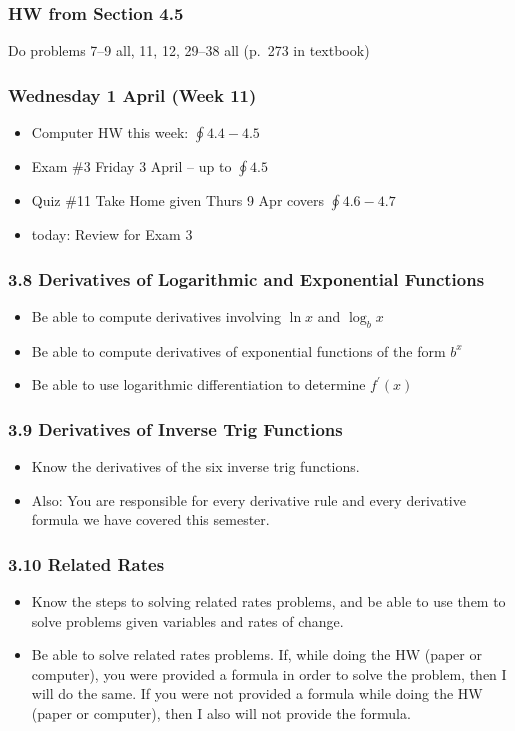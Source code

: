 \documentclass[14pt]{beamer}
\begin{document}
\begin{frame}
\frametitle{HW from Section 4.5}
Do problems 7--9 all, 11, 12, 29--38 all (p.\ 273 in textbook)
\end{frame}



\begin{frame}
\frametitle{Wednesday 1 April (Week 11)}
\small
\begin{itemize}
\item Computer HW this week: $\oint 4.4-4.5$
\item Exam \#3 Friday 3 April -- up to $\oint 4.5$
\item Quiz \#11 Take Home given Thurs 9 Apr covers $\oint 4.6-4.7$
\item today: Review for Exam 3
\end{itemize}
\end{frame}

\begin{frame}
\frametitle{\small 3.8 Derivatives of Logarithmic and Exponential Functions}
\small
\begin{itemize}
\item Be able to compute derivatives involving $\ln x$ and $\log_b x$
\item Be able to compute derivatives of exponential functions of the form $b^x$
\item Be able to use logarithmic differentiation to determine $f^{\prime}(x)$
\end{itemize}
\end{frame}

\begin{frame}
\frametitle{\small 3.9 Derivatives of Inverse Trig Functions}
\small
\begin{itemize}
\item Know the derivatives of the six inverse trig functions.
\item Also: You are responsible for every derivative rule and every derivative formula we have covered this semester.
\end{itemize} 
\end{frame}

\begin{frame}
\frametitle{\small 3.10 Related Rates}
\small
\begin{itemize}
\item Know the steps to solving related rates problems, and be able to use them to solve problems given variables and rates of change.
\item Be able to solve related rates problems.  If, while doing the HW (paper or computer), you were provided a formula in order to solve the problem, then I will do the same.  If you were not provided a formula while doing the HW (paper or computer), then I also will not provide the formula.
\end{itemize}
\end{frame}
\end{document}

